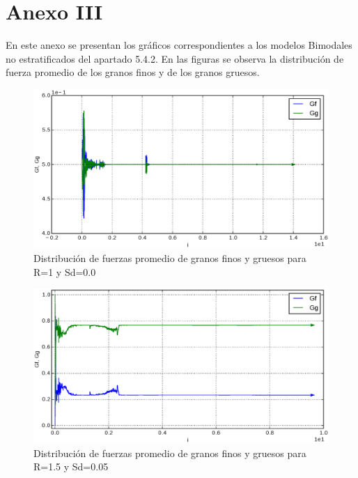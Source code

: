 \chapter*{ Anexo III} 

En este anexo se presentan los gr\'aficos correspondientes a los modelos Bimodales no estratificados del apartado 5.4.2. En las figuras se observa la distribuci\'on de fuerza promedio de los granos finos y de los granos gruesos.\\

\begin{figure}[htb]
\centering
\includegraphics[width=\textwidth]{Anexo2/PSD_10}
\caption{Distribuci\'on de fuerzas promedio de granos finos y gruesos para R=1 y Sd=0.0}
\label{fig:PSD10}
\end{figure}

\begin{figure}[htb]
\centering
\includegraphics[width=\textwidth]{Anexo2/PSD_15}
\caption{Distribuci\'on de fuerzas promedio de granos finos y gruesos para R=1.5 y Sd=0.05}
\label{fig:PSD15}
\end{figure}


